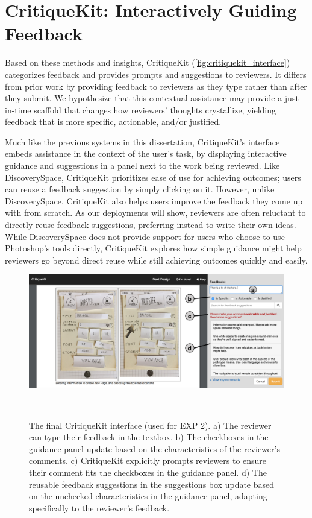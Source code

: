 \section{CritiqueKit: Interactively Guiding Feedback}
Based on these methods and insights, CritiqueKit (\autoref{fig:critiquekit_interface}) categorizes feedback and provides prompts and suggestions to reviewers. It differs from prior work by providing feedback to reviewers as they type rather than after they submit. We hypothesize that this contextual assistance may provide a just-in-time scaffold that changes how reviewers' thoughts crystallize, yielding feedback that is more specific, actionable, and/or justified. 

Much like the previous systems in this dissertation, CritiqueKit's interface embeds assistance in the context of the user's task, by displaying interactive guidance and suggestions in a panel next to the work being reviewed. Like Discovery\-Space, CritiqueKit prioritizes ease of use for achieving outcomes; users can reuse a feedback suggestion by simply clicking on it. However, unlike Discovery\-Space, CritiqueKit also helps users improve the feedback they come up with from scratch. As our deployments will show, reviewers are often reluctant to directly reuse feedback suggestions, preferring instead to write their own ideas. While Discovery\-Space does not provide support for users who choose to use Photoshop's tools directly, CritiqueKit explores how simple guidance might help reviewers go beyond direct reuse while still achieving outcomes quickly and easily.

\begin{figure}[b!]
\centering
  \includegraphics[width=\textwidth]{critiquekit/figures/interface.png}
  \caption[The final CritiqueKit interface (used for EXP 2).]{The final CritiqueKit interface (used for EXP 2). a) The reviewer can type their feedback in the textbox. b) The checkboxes in the guidance panel update based on the characteristics of the reviewer’s comments. c) CritiqueKit explicitly prompts reviewers to ensure their comment fits the checkboxes in the guidance panel. d) The reusable feedback suggestions in the suggestions box update based on the unchecked characteristics in the guidance panel, adapting specifically to the reviewer's feedback.}~\label{fig:critiquekit_interface}
\end{figure}

